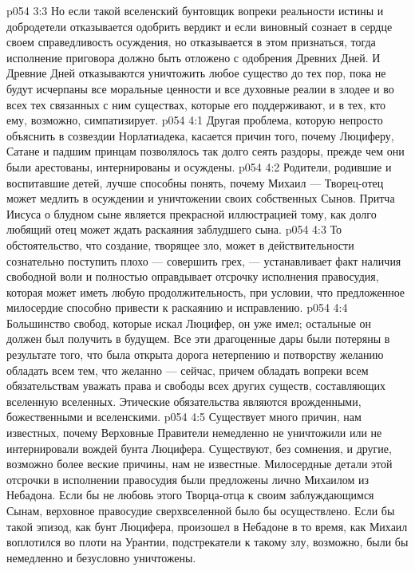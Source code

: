 \vs p054 3:3 Но если такой вселенский бунтовщик вопреки реальности истины и добродетели отказывается одобрить вердикт и если виновный сознает в сердце своем справедливость осуждения, но отказывается в этом признаться, тогда исполнение приговора должно быть отложено с одобрения Древних Дней. И Древние Дней отказываются уничтожить любое существо до тех пор, пока не будут исчерпаны все моральные ценности и все духовные реалии в злодее и во всех тех связанных с ним существах, которые его поддерживают, и в тех, кто ему, возможно, симпатизирует.
\vs p054 4:1 Другая проблема, которую непросто объяснить в созвездии Норлатиадека, касается причин того, почему Люциферу, Сатане и падшим принцам позволялось так долго сеять раздоры, прежде чем они были арестованы, интернированы и осуждены.
\vs p054 4:2 Родители, родившие и воспитавшие детей, лучше способны понять, почему Михаил --- Творец\hyp{}отец может медлить в осуждении и уничтожении своих собственных Сынов. Притча Иисуса о блудном сыне является прекрасной иллюстрацией тому, как долго любящий отец может ждать раскаяния заблудшего сына.
\vs p054 4:3 То обстоятельство, что создание, творящее зло, может в действительности сознательно поступить плохо --- совершить грех, --- устанавливает факт наличия свободной воли и полностью оправдывает отсрочку исполнения правосудия, которая может иметь любую продолжительность, при условии, что предложенное милосердие способно привести к раскаянию и исправлению.
\vs p054 4:4 \pc Большинство свобод, которые искал Люцифер, он уже имел; остальные он должен был получить в будущем. Все эти драгоценные дары были потеряны в результате того, что была открыта дорога нетерпению и потворству желанию обладать всем тем, что желанно --- сейчас, причем обладать вопреки всем обязательствам уважать права и свободы всех других существ, составляющих вселенную вселенных. Этические обязательства являются врожденными, божественными и вселенскими.
\vs p054 4:5 \pc Существует много причин, нам известных, почему Верховные Правители немедленно не уничтожили или не интернировали вождей бунта Люцифера. Существуют, без сомнения, и другие, возможно более веские причины, нам не известные. Милосердные детали этой отсрочки в исполнении правосудия были предложены лично Михаилом из Небадона. Если бы не любовь этого Творца\hyp{}отца к своим заблуждающимся Сынам, верховное правосудие сверхвселенной было бы осуществлено. Если бы такой эпизод, как бунт Люцифера, произошел в Небадоне в то время, как Михаил воплотился во плоти на Урантии, подстрекатели к такому злу, возможно, были бы немедленно и безусловно уничтожены.
